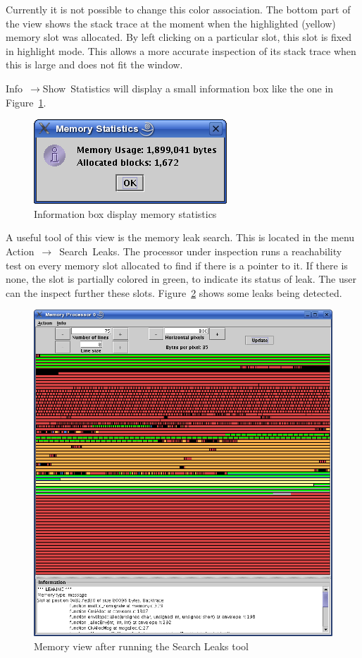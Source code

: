 Currently it is not possible to change this color association. The bottom part
of the view shows the stack trace at the moment when the highlighted (yellow)
memory slot was allocated. By left clicking on a particular slot, this slot is
fixed in highlight mode. This allows a more accurate inspection of its stack
trace when this is large and does not fit the window.

Info~$\rightarrow$Show~Statistics will display a small information box like the
one in Figure~\ref{fig:memory-stat}.

\begin{figure}[ht!]
\centering
\includegraphics[scale=0.5]{figs/memoryStatistics}
\caption{Information box display memory statistics}
\label{fig:memory-stat}
\end{figure}

A useful tool of this view is the memory leak search. This is located in the
menu Action~$\rightarrow$~Search~Leaks. The processor under inspection runs a
reachability test on every memory slot allocated to find if there is a pointer
to it. If there is none, the slot is partially colored in green, to indicate its
status of leak. The user can the inspect further these slots. 
Figure~\ref{fig:memory-leak} shows some leaks being detected.

\begin{figure}[ht!]
\centering
\includegraphics[scale=0.5]{figs/memoryLeaking}
\caption{Memory view after running the Search Leaks tool}
\label{fig:memory-leak}
\end{figure}

